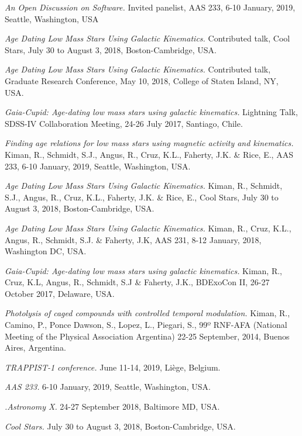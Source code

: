 \documentclass[10pt]{cv}
\begin{document}
\begin{llist}
\textit{An Open Discussion on Software.} Invited panelist, AAS 233, 6-10 January, 2019, Seattle, Washington, USA

\textit{Age Dating Low Mass Stars Using Galactic Kinematics.} Contributed talk, Cool Stars, July 30 to August 3, 2018, Boston-Cambridge, USA.

\textit{Age Dating Low Mass Stars Using Galactic Kinematics.} Contributed talk, Graduate Research Conference, May 10, 2018, College of Staten Island, NY, USA.

\textit{Gaia-Cupid: Age-dating low mass stars using galactic kinematics.} Lightning Talk, SDSS-IV Collaboration Meeting, 24-26 July 2017, Santiago, Chile. 


\textit{Finding age relations for low mass stars using magnetic activity and kinematics.} Kiman, R., Schmidt, S.J., Angus, R., Cruz, K.L., Faherty, J.K. \& Rice, E., AAS 233, 6-10 January, 2019, Seattle, Washington, USA.

\textit{Age Dating Low Mass Stars Using Galactic Kinematics.} Kiman, R., Schmidt, S.J., Angus, R., Cruz, K.L., Faherty, J.K. \& Rice, E., Cool Stars, July 30 to August 3, 2018, Boston-Cambridge, USA.

\textit{Age Dating Low Mass Stars Using Galactic Kinematics.} Kiman, R., Cruz, K.L., Angus, R., Schmidt, S.J. \& Faherty, J.K, AAS 231, 8-12 January, 2018, Washington DC, USA. 

\textit{Gaia-Cupid: Age-dating low mass stars using galactic kinematics.} Kiman, R., Cruz, K.L, Angus, R., Schmidt, S.J \& Faherty, J.K., BDExoCon II, 26-27 October 2017, Delaware, USA. 

\textit{Photolysis of caged compounds with controlled temporal modulation.} Kiman, R., Camino, P., Ponce Dawson, S., Lopez, L., Piegari, S., 99º RNF-AFA (National Meeting of the Physical Association Argentina) 22-25 September, 2014, Buenos Aires, Argentina.


\textit{TRAPPIST-1 conference.} June 11-14, 2019, Li\`ege, Belgium.

\textit{AAS 233.} 6-10 January, 2019, Seattle, Washington, USA.

\textit{.Astronomy X.} 24-27 September 2018, Baltimore MD, USA.

\textit{Cool Stars.} July 30 to August 3, 2018, Boston-Cambridge, USA.


\end{llist}
\end{document}
